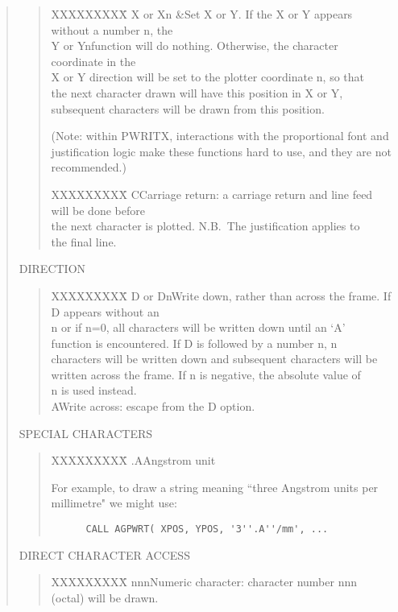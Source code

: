 \begin{quote}
\begin{quote}
\begin{tabbing}
XXXXXXXXX\=\kill
X or Xn \&\>Set X or Y.  If the X or Y appears without a number n, the\\
Y or Yn\>function will do nothing.  Otherwise, the character coordinate in the\\
\>X or Y direction will be set to the plotter coordinate n, so that\\
\>the next character drawn will have this position in X or Y,\\
\>subsequent characters will be drawn from this position.
\end{tabbing}
(Note: within PWRITX, interactions with the proportional font
and justification logic make these functions hard to use, and
they are not recommended.)
\begin{tabbing}
XXXXXXXXX\=\kill
C\>Carriage return: a carriage return and line feed will be done before\\
\>the next character is plotted. N.B.\ The justification applies to\\
\>the final line.
\end{tabbing}
\end{quote}

DIRECTION

\begin{quote}
\begin{tabbing}
XXXXXXXXX\=\kill
D or Dn\>Write down, rather than across the frame.  If D appears without an\\
\>n or if n=0, all characters will be written down until an `A'\\
\>function is encountered.  If D is followed by a number n, n\\
\>characters will be written down and subsequent characters will be\\
\>written across the frame.  If n is negative, the absolute value of\\
\>n is used instead.\\
A\>Write across: escape from the D option.
\end{tabbing}
\end{quote}

SPECIAL CHARACTERS

\begin{quote}
\begin{tabbing}
XXXXXXXXX\=\kill
.A\>Angstrom unit
\end{tabbing}

For example, to draw a string meaning ``three Angstrom units per
millimetre" we might use:

\begin{verbatim}
      CALL AGPWRT( XPOS, YPOS, '3''.A''/mm', ...
\end{verbatim}
\end{quote}

DIRECT CHARACTER ACCESS

\begin{quote}
\begin{tabbing}
XXXXXXXXX\=\kill
nnn\>Numeric character: character number nnn (octal) will be drawn.
\end{tabbing}
\end{quote}
\end{quote}

